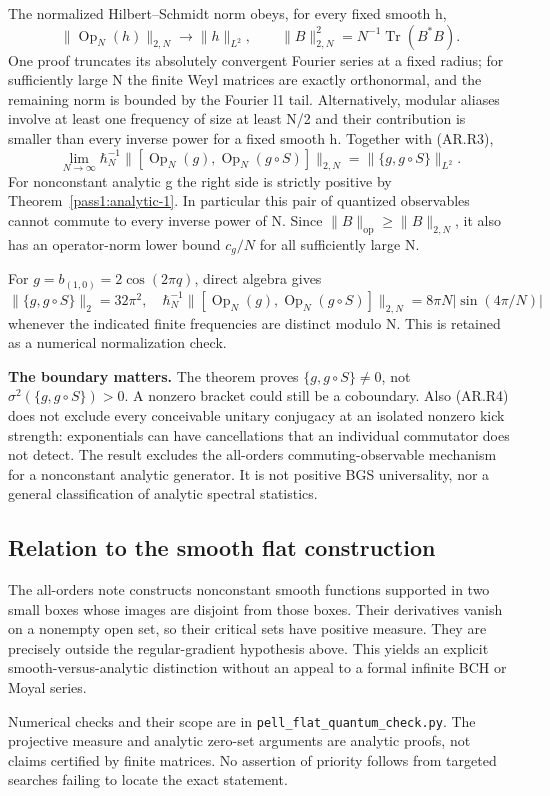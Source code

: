 The normalized Hilbert--Schmidt norm obeys, for every fixed smooth h, \[
       \|\operatorname{Op}_N(h)\|_{2,N}\longrightarrow\|h\|_{L^2},
       \qquad \|B\|_{2,N}^2=N^{-1}\operatorname{Tr}(B^*B).
\] One proof truncates its absolutely convergent Fourier series at a fixed radius; for sufficiently large N the finite Weyl matrices are exactly orthonormal, and the remaining norm is bounded by the Fourier l1 tail. Alternatively, modular aliases involve at least one frequency of size at least N/2 and their contribution is smaller than every inverse power for a fixed smooth h. Together with (AR.R3), \[
 \boxed{\displaystyle
 \lim_{N\to\infty}\hbar_N^{-1}
 \|[\operatorname{Op}_N(g),\operatorname{Op}_N(g\circ S)]\|_{2,N}
                         =\|\{g,g\circ S\}\|_{L^2}.}        \tag{AR.R4}
\] For nonconstant analytic g the right side is strictly positive by Theorem~\ref{pass1:analytic-1}. In particular this pair of quantized observables cannot commute to every inverse power of N. Since \(\|B\|_{\mathrm{op}}\geq\|B\|_{2,N}\), it also has an operator-norm lower bound \(c_g/N\) for all sufficiently large N.

For \(g=b_{(1,0)}=2\cos(2\pi q)\), direct algebra gives \[
 \|\{g,g\circ S\}\|_2=32\pi^2,
 \quad \hbar_N^{-1}\|[\operatorname{Op}_N(g),\operatorname{Op}_N(g\circ S)]\|_{2,N}
       =8\pi N|\sin(4\pi/N)|
\] whenever the indicated finite frequencies are distinct modulo N. This is retained as a numerical normalization check.

\textbf{The boundary matters.} The theorem proves \(\{g,g\circ S\}\ne0\), not \(\sigma^2(\{g,g\circ S\})>0\). A nonzero bracket could still be a coboundary. Also (AR.R4) does not exclude every conceivable unitary conjugacy at an isolated nonzero kick strength: exponentials can have cancellations that an individual commutator does not detect. The result excludes the all-orders commuting-observable mechanism for a nonconstant analytic generator. It is not positive BGS universality, nor a general classification of analytic spectral statistics.

\subsection{Relation to the smooth flat construction}\label{analytic:relation-to-the-smooth-flat-construction}

The all-orders note constructs nonconstant smooth functions supported in two small boxes whose images are disjoint from those boxes. Their derivatives vanish on a nonempty open set, so their critical sets have positive measure. They are precisely outside the regular-gradient hypothesis above. This yields an explicit smooth-versus-analytic distinction without an appeal to a formal infinite BCH or Moyal series.

Numerical checks and their scope are in \texttt{pell\_flat\_quantum\_check.py}. The projective measure and analytic zero-set arguments are analytic proofs, not claims certified by finite matrices. No assertion of priority follows from targeted searches failing to locate the exact statement.
